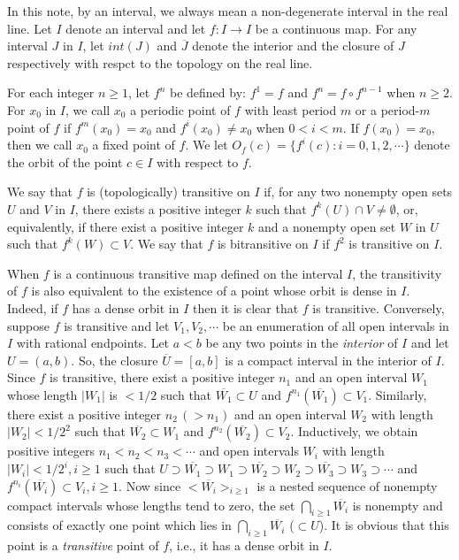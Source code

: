 \documentclass[12pt]{article}
\newcommand{\ov}{\overline}
\begin{document}
In this note, by an interval, we always mean a non-degenerate interval in the real line.  Let $I$ denote an interval and let $f : I \rightarrow I$ be a continuous map.  For any interval $J$ in $I$, let $int(J)$ and $\ov J$ denote the interior and the closure of $J$ respectively with respct to the topology on the real line.  

For each integer $n \ge 1$, let $f^n$ be defined by: $f^1 = f$ and $f^n = f \circ f^{n-1}$ when $n \ge 2$.  For $x_0$ in $I$, we call $x_0$ a periodic point of $f$ with least period $m$ or a period-$m$ point of $f$ if $f^m(x_0) = x_0$ and $f^i(x_0) \ne x_0$ when $0 < i < m$.  If $f(x_0) = x_0$, then we call $x_0$ a fixed point of $f$.  We let $O_f(c) = \{ f^i(c) : i = 0, 1, 2, \cdots \}$ denote the orbit of the point $c \in I$ with respect to $f$.  

We say that $f$ is (topologically) transitive on $I$ if, for any two nonempty open sets $U$ and $V$ in $I$, there exists a positive integer $k$ such that $f^k(U) \cap V \ne \emptyset$, or, equivalently, if there exist a positive integer $k$ and a nonempty open set $W$ in $U$ such that $f^k(W) \subset V$.  We say that $f$ is bitransitive on $I$ if $f^2$ is transitive on $I$.  

When $f$ is a continuous transitive map defined on the interval $I$, the transitivity of $f$ is also equivalent to the existence of a point whose orbit is dense in $I$.  Indeed, if $f$ has a dense orbit in $I$ then it is clear that $f$ is transitive.  Conversely, suppose $f$ is transitive and let $V_1, V_2, \cdots$ be an enumeration of all open intervals in $I$ with rational endpoints.  Let $a < b$ be any two points in the {\it interior} of $I$ and let $U = (a, b)$.  So, the closure $\overline{U} = [a, b]$ is a compact interval in the interior of $I$.  Since $f$ is transitive, there exist a positive integer $n_1$ and an open interval $W_1$ whose length $|W_1|$ is $< 1/2$ such that $\overline{W_1} \subset U$ and  $f^{n_1}(\overline{W_1}) \subset V_1$.  Similarly, there exist a positive integer $n_2 \, (> n_1)$ and an open interval $W_2$ with length $|W_2| < 1/2^2$ such that $\overline{W_2} \subset W_1$ and $f^{n_2}(\overline{W_2}) \subset V_2$.  Inductively, we obtain positive integers $n_1 < n_2 < n_3 < \cdots$ and open intervals $W_i$ with length $|W_i| < 1/2^i, i \ge 1$ such that $U \supset \overline{W_1} \supset W_1 \supset \overline{W_2} \supset W_2 \supset \overline{W_3} \supset W_3 \supset \cdots$ and $f^{n_i}(\overline{W_i}) \subset V_i, i \ge 1$.  Now since $< \overline{W_i} >_{i \ge 1}$ is a nested sequence of nonempty compact intervals whose lengths tend to zero, the set $\bigcap_{i \ge 1} \overline{W_i}$ is nonempty and consists of exactly one point which lies in $\bigcap_{i \ge 1} \overline{W_i}$ ($\subset U$).  It is obvious that this point is a {\it transitive} point of $f$, i.e., it has a dense orbit in $I$. 
\end{document}
